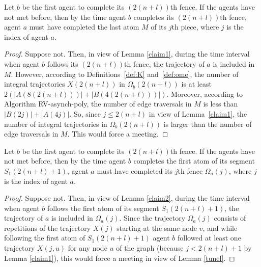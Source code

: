 \documentclass [11pt] {article}
\begin{document}
\begin{lemma}
\label{claim2}
Let $b$ be the first agent to complete its $(2(n+l))$th fence. If the agents have not met before, then by the time agent $b$ completes its $(2(n+l))$th fence,
agent $a$ must have completed the last {atom $M$} of its $j$th piece, where $j$ is the index of agent $a$.
\end{lemma}

\begin{proof}
Suppose not. Then, in view of Lemma \ref{claim1}, during the time interval when agent $b$ follows its $(2(n+l))$th fence, the trajectory of $a$ is included in {$M$}. However, according to {Definitions~\ref{def:K} and~\ref{def:ome}}, the number of integral trajectories $X(2(n+l))$ in $\Omega_b(2(n+l))$ is {at least} $2(|A(8(2(n+l)))|+|B(4(2(n+l)))|)$. Moreover, according to Algorithm RV-asynch-poly, the number of {edge traversals} in {$M$} is less than $|B(2j)| + |A(4j)|$. So, since $j\leq 2(n+l)$ in view of Lemma~\ref{claim1}, the number of integral trajectories in $\Omega_b(2(n+l))$ is larger than the number of {edge traversals} in {$M$}. This would force a meeting. 
\end{proof}

{
\begin{lemma}
\label{claim3}
Let $b$ be the first agent to complete its $(2(n+l))$th fence. If the agents have not met before, then by the time agent $b$ completes the first atom of its segment $S_{{1}}(2(n+l)+1)$, agent $a$ must have completed its $j$th fence $\Omega_a(j)$, where $j$ is the index of agent $a$.
\end{lemma}}
{
\begin{proof}
Suppose not. Then, in view of Lemma \ref{claim2}, during the time interval when agent $b$ follows the first atom of its segment $S_{{1}}(2(n+l)+1)$, the trajectory of $a$ is included in $\Omega_a(j)$. Since the trajectory $\Omega_a(j)$ consists of repetitions of the trajectory $X(j)$ starting at the same node $v$, and while following the first atom of $S_{{1}}(2(n+l)+1)$ agent $b$ followed at least one trajectory $X(j,u)$ for any node $u$ of the graph (because $j< 2(n+l)+1$ by Lemma \ref{claim1}), this would force a meeting in view of Lemma \ref{tunel}.
\end{proof}}
\end{document}
